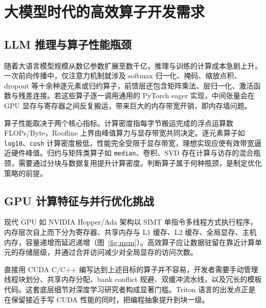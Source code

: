 \section{大模型时代的高效算子开发需求}

\subsection{LLM 推理与算子性能瓶颈}
随着大语言模型规模从数亿参数扩展至数千亿，推理与训练的计算成本急剧上升。一次前向传播中，仅注意力机制就涉及 softmax 归一化、掩码、缩放点积、dropout 等十余种逐元素或归约算子，前馈层还包含矩阵乘法、层归一化、激活函数与残差连接。若这些算子逐一调用通用的 PyTorch eager 实现，中间张量会在 GPU 显存与寄存器之间反复搬运，带来巨大的内存带宽开销，即内存墙问题。

算子性能取决于两个核心指标。计算密度指每字节搬运完成的浮点运算数 FLOPs/Byte，Roofline 上界由峰值算力与显存带宽共同决定。逐元素算子如 \texttt{log10}、\texttt{cosh} 计算密度极低，性能完全受限于显存带宽，理想实现应使有效带宽逼近硬件峰值。归约与矩阵类算子如 \texttt{median}、卷积、SVD 存在计算与访存的混合瓶颈，需要通过分块与数据复用提升计算密度。判断算子属于何种瓶颈，是制定优化策略的前提。

\subsection{GPU 计算特征与并行优化挑战}
现代 GPU 如 NVIDIA Hopper/Ada 架构以 SIMT 单指令多线程方式执行程序，内存层次自上而下分为寄存器、共享内存与 L1 缓存、L2 缓存、全局显存、主机内存，容量递增而延迟递增（图~\ref{fig:mem}）。高效算子应让数据驻留在靠近计算单元的存储层级，并通过合并访问减少对全局显存的访问次数。

直接用 CUDA C/C++ 编写达到上述目标的算子并不容易，开发者需要手动管理线程块划分、共享内存分配、bank conflict 规避、双缓冲流水线，以及冗长的模板代码。这套底层细节对深度学习研究者构成显著门槛。Triton 语言的出发点正是在保留接近手写 CUDA 性能的同时，把编程抽象提升到块一级。

